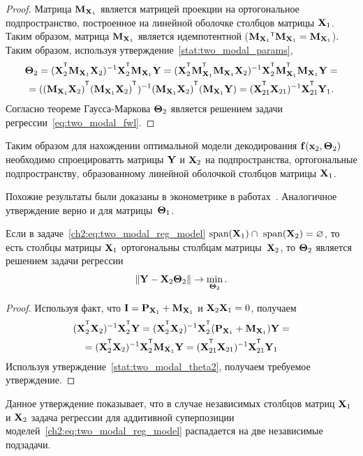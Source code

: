 \begin{proof}
	Матрица $\mathbf{M}_{\mathbf{X}_1}$ является матрицей проекции на ортогональное подпространство, построенное на линейной оболочке столбцов матрицы $\mathbf{X}_1$. Таким образом, матрица $\mathbf{M}_{\mathbf{X}_1}$ является идемпотентной ($\bM_{\bX_1}{\T} \bM_{\bX_1} = \bM_{\bX_1}$). 
	Таким образом, используя утверждение~\autoref{stat:two_modal_params},
	\begin{multline*}
		\bTheta_2 = (\bX_2^{\T} \bM_{\bX_1} \bX_2)^{-1} \bX_2^{\T} \bM_{\bX_1} \bY = (\bX_2^{\T} \bM_{\bX_1}^{\T} \bM_{\bX_1} \bX_2)^{-1} \bX_2^{\T} \bM_{\bX_1}^{\T} \bM_{\bX_1} \bY = \\
		= ((\bM_{\bX_1} \bX_2)^{\T} (\bM_{\bX_1} \bX_2)^{\T})^{-1} (\bM_{\bX_1} \bX_2)^{\T} (\bM_{\bX_1} \bY) = (\bX_{21}^{\T} \bX_{21})^{-1} \bX_{21}^{\T} \bY_1.
	\end{multline*}
	Согласно теореме Гаусса-Маркова $\boldsymbol{\Theta}_2$ является решением задачи регрессии~\eqref{eq:two_modal_fwl}.
\end{proof}

Таким образом для нахождении оптимальной модели декодирования $\mathbf{f}(\mathbf{x}_2, \boldsymbol{\Theta}_2)$ необходимо спроецироватть матрицы $\mathbf{Y}$ и $\mathbf{X}_2$ на подпространства, ортогональные подпространству, образованному линейной оболочкой столбцов матрицы $\mathbf{X}_1$.

Похожие результаты были доказаны в эконометрике в работах~\cite{frisch1933partial,lovell1963seasonal,cinelli2020making}. Аналогичное утверждение верно и для матрицы~$\boldsymbol{\Theta}_1$. 

\begin{statement}
	Если в задаче~\eqref{ch2:eq:two_modal_reg_model} $\text{span}(\mathbf{X}_1) \cap \text{ span}(\mathbf{X}_2) = \varnothing$, то есть столбцы матрицы $\mathbf{X}_1$ ортогональны столбцам матрицы~$\mathbf{X}_2$, то $\boldsymbol{\Theta}_2$ является решением задачи регрессии
	\[
			\| \mathbf{Y} -  \mathbf{X}_{2} \boldsymbol{\Theta}_2 \| \rightarrow \min_{\boldsymbol{\Theta}_2}.
	\]
\end{statement}

\begin{proof}
	Используя факт, что $\mathbf{I} = \mathbf{P}_{\mathbf{X}_1} + \mathbf{M}_{\mathbf{X}_1}$ и $\mathbf{X}_2 \mathbf{X}_1 = 0$, получаем
	\begin{multline*}
		(\bX_2^{\T} \bX_2)^{-1} \bX_2^{\T} \bY = (\bX_2^{\T} \bX_2)^{-1} \bX_2^{\T} (\bP_{\bX_1} + \bM_{\bX_1}) \bY = \\ = (\bX_2^{\T} \bX_2)^{-1} \bX_2^{\T} \bM_{\bX_1} \bY  = (\bX_{21}^{\T} \bX_{21})^{-1} \bX_{21}^{\T} \bY_1
	\end{multline*}
	Используя утверждение~\autoref{stat:two_modal_theta2}, получаем требуемое утверждение.
\end{proof}
Данное утверждение показывает, что в случае независимых столбцов матриц $\mathbf{X}_1$ и $\mathbf{X}_2$ задача регрессии для аддитивной суперпозиции моделей~\eqref{ch2:eq:two_modal_reg_model} распадается на две независимые подзадачи.

